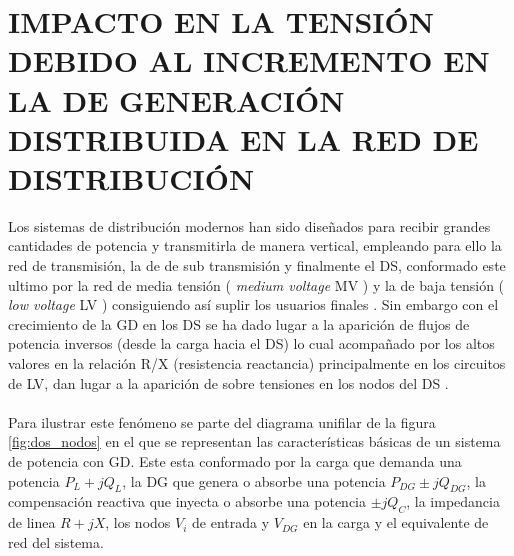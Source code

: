 \documentclass[12pt, letterpaper]{report}
\begin{document}
\chapter{IMPACTO EN LA TENSIÓN DEBIDO AL INCREMENTO EN LA DE GENERACIÓN DISTRIBUIDA EN LA RED DE DISTRIBUCIÓN}
Los sistemas de distribución modernos han sido diseñados para recibir grandes cantidades de potencia y transmitirla de manera vertical\cite{Badran2017}, empleando para ello la red de transmisión, la de  de sub transmisión y finalmente el DS, conformado este ultimo por la red de media tensión ( \textit{medium voltage} MV ) y la de baja tensión ( \textit{low voltage} LV ) \cite{Tang2017} consiguiendo así suplir los usuarios finales \cite{Delfanti2013}. Sin embargo con el crecimiento de la GD en los DS se ha dado lugar a la aparición de flujos de potencia inversos (desde la carga hacia el DS) lo cual acompañado por los altos valores en la relación R/X (resistencia reactancia) principalmente en los circuitos de LV, dan lugar a la aparición de sobre tensiones en los nodos del  DS \cite{su2009comparative}\cite{Tang2017}.\\\\
Para ilustrar este fenómeno se parte  del diagrama unifilar de la figura \ref{fig:dos_nodos} en el que se representan las características básicas de un sistema de potencia con GD. Este esta conformado por la carga que demanda una potencia $P_{L}+jQ_{L}$, la DG que genera o absorbe una potencia $P_{DG}\pm jQ_{DG}$,  la compensación reactiva que inyecta o absorbe una potencia $\pm jQ_{C}$, la impedancia de linea $R+jX$,  los nodos $V_{i} $ de entrada y $V_{DG}$ en la carga y el equivalente de red del sistema.\\\\
\end{document}
